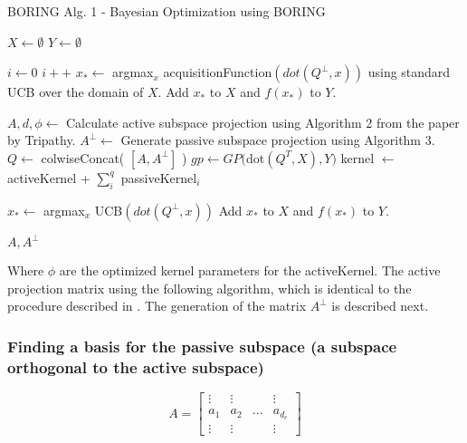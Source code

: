 \begin{algorithm}[H]
\caption{BORING Alg. 1 - Bayesian Optimization using BORING}

\begin{algorithmic} 
\STATE $X \leftarrow \emptyset$
\STATE $Y \leftarrow \emptyset$

\STATE $i \leftarrow 0$
\STATE $i++$
\STATE $x_* \leftarrow $ argmax$_x$ acquisitionFunction$(dot(Q^{\bot}, x) )$ using standard UCB over the domain of $X$.
\STATE Add $x_*$ to $X$ and $ f(x_*)$ to $Y$.
\ENDWHILE

\STATE $A, d, \phi \leftarrow $ Calculate active subspace projection using Algorithm 2 from the paper by Tripathy.
\STATE $A^{\bot} \leftarrow $ Generate passive subspace projection using Algorithm 3.
\STATE $Q \leftarrow $ colwiseConcat( $[A, A^{\bot}]$ ) 
\STATE $gp \leftarrow GP( $dot$( Q^T, X), Y)$
\STATE kernel $\leftarrow$ activeKernel + $\sum_i^{q}$ passiveKernel$_i$ 

\STATE $x_* \leftarrow $ argmax$_x$ UCB$(dot(Q^{\bot}, x) )$
\STATE Add $x_*$ to $X$ and $ f(x_*)$ to $Y$.
\ENDWHILE

\RETURN $A, A^\bot$
\end{algorithmic}

\end{algorithm}

Where $\phi$ are the optimized kernel parameters for the activeKernel.
The active projection matrix using the following algorithm, which is identical to the procedure described in \citep{Tripathy}.
The generation of the matrix $ A^{\bot} $ is described next.

\subsubsection{Finding a basis for the passive subspace (a subspace orthogonal to the active subspace)}

\begin{equation}
A = 
\begin{bmatrix}
 \vdots & \vdots & & \vdots \\
 a_1 & a_2 & ... & a_{d_e} \\
 \vdots & \vdots & & \vdots
\end{bmatrix}
\label{eq:maximalEmbedding}
\end{equation}

